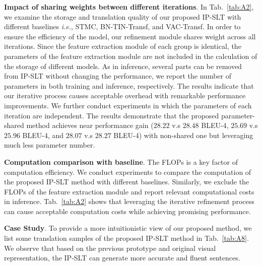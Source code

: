 \documentclass[10pt,twocolumn,letterpaper]{article}
\begin{document}
    \smallskip
    \noindent \textbf{Impact of sharing weights between different iterations}.
    In Tab.~\ref{tab:A2}, we examine the storage and translation quality of our proposed IP-SLT with different baselines \emph{i.e.}, STMC, BN-TIN-Transf, and VAC-Transf. In order to ensure the efficiency of the model, our refinement module shares weight across all iterations. 
    Since the feature extraction module of each group is identical, the parameters of the feature extraction module are not included in the calculation of the storage of different models.
    As in inference, several parts can be removed from IP-SLT without changing the performance, we report the number of parameters in both training and inference, respectively. The results indicate that our iterative process causes acceptable overhead with remarkable performance improvements. We further conduct experiments in which the parameters of each iteration are independent. The results demonstrate that the proposed parameter-shared method achieves near performance gain ($28.22$ v.s $28.48$ BLEU-4, $25.69$ v.s $25.96$ BLEU-4, and $28.07$ v.s $28.27$ BLEU-4) with non-shared one but leveraging much less parameter number.

    

    \smallskip
    \noindent \textbf{Computation comparison with baseline}. 
    The FLOPs is a key factor of computation efficiency. We conduct experiments to compare the computation of the proposed IP-SLT method with different baselines. 
    Similarly, we exclude the FLOPs of the feature extraction module and report relevant computational costs in inference.
    Tab.~\ref{tab:A2} shows that leveraging the iterative refinement process can cause acceptable computation costs while achieving promising performance.
    
    
     
    \smallskip
    \noindent \textbf{Case Study}.
    To provide a more intuitionistic view of our proposed method, we list some translation samples of the proposed IP-SLT method in Tab.~\ref{tab:A8}. We observe that based on the previous prototype and original visual representation, the IP-SLT can generate more accurate and fluent sentences. 
    
\end{document}
